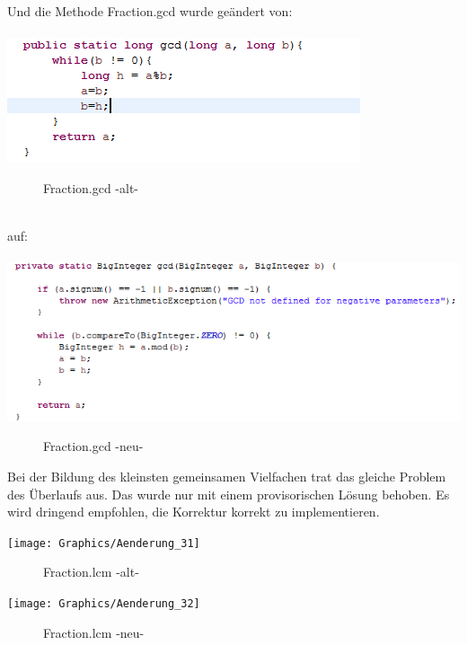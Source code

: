 \documentclass[draft]{scrreprt}
\begin{document}
{Und die Methode Fraction.gcd wurde geändert von:\\
\\
\includegraphics[scale = 0.95]{Graphics/Aenderung_211}
\begin{figure}[h]
	\caption{Fraction.gcd -alt-}
\end{figure}
\\
auf:\\
\\
\includegraphics[scale = 0.95]{Graphics/Aenderung_212}
\begin{figure}[h]
	\caption{Fraction.gcd -neu-}
\end{figure}

Bei der Bildung des kleinsten gemeinsamen Vielfachen trat das gleiche Problem des Überlaufs aus. Das wurde nur mit einem provisorischen Lösung behoben. Es wird dringend empfohlen, die Korrektur korrekt zu implementieren. 

\texttt{[image: Graphics/Aenderung\_31]}
\begin{figure}[h]
	\caption{Fraction.lcm -alt-}
\end{figure}


\texttt{[image: Graphics/Aenderung\_32]}
\begin{figure}[h]
	\caption{Fraction.lcm -neu-}
\end{figure}

}
\end{document}
